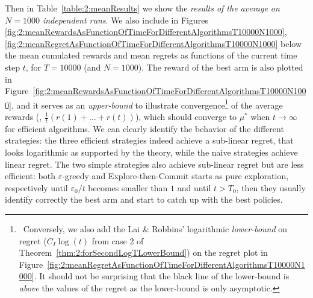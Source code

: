 Then in Table~\ref{table:2:meanResults} we show the \emph{results of the average on $N=1000$ independent runs}.
%
%
We also include in Figures
\ref{fig:2:meanRewardsAsFunctionOfTimeForDifferentAlgorithmsT10000N1000}, \ref{fig:2:meanRegretAsFunctionOfTimeForDifferentAlgorithmsT10000N1000} below the mean cumulated rewards and mean regrets as functions of the current time step $t$, for $T=10000$ (and $N=1000$).
The reward of the best arm is also plotted in Figure~\ref{fig:2:meanRewardsAsFunctionOfTimeForDifferentAlgorithmsT10000N1000}, and it serves as an \emph{upper-bound} to illustrate convergence\footnote{~Conversely, we also add the Lai \& Robbins' logarithmic \emph{lower-bound} on regret ($C_I \log(t)$ from case 2 of Theorem~\ref{thm:2:forSecondLogTLowerBound}) on the regret plot in Figure~\ref{fig:2:meanRegretAsFunctionOfTimeForDifferentAlgorithmsT10000N1000}. It should not be surprising that the black line of the lower-bound is \emph{above} the values of the regret as the lower-bound is only asymptotic.}
of the average rewards
(\ie, $\frac{1}{t} (r(1) + \dots + r(t))$),
which should converge to $\mu^*$ when $t\to\infty$ for efficient algorithms.
%
We can clearly identify the behavior of the different strategies:
the three efficient strategies indeed achieve a sub-linear regret, that looks logarithmic as supported by the theory,
while the naive strategies achieve linear regret.
The two simple strategies also achieve sub-linear regret but are less efficient:
both $\varepsilon$-greedy and Explore-then-Commit starts as pure exploration, respectively until $\varepsilon_0/t$ becomes smaller than $1$ and until $t > T_0$, then they usually identify correctly the best arm and start to catch up with the best policies.


